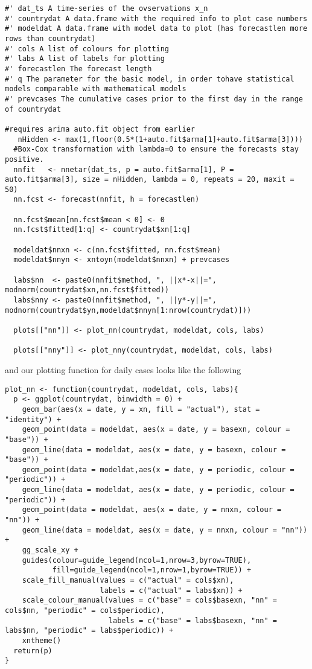 \begin{lstlisting}[frame=single, caption = {Algorithm for Neural Network Model}]
#' dat_ts A time-series of the ovservations x_n
#' countrydat A data.frame with the required info to plot case numbers
#' modeldat A data.frame with model data to plot (has forecastlen more rows than countrydat)
#' cols A list of colours for plotting
#' labs A list of labels for plotting
#' forecastlen The forecast length 
#' q The parameter for the basic model, in order tohave statistical models comparable with mathematical models
#' prevcases The cumulative cases prior to the first day in the range of countrydat

#requires arima auto.fit object from earlier
   nHidden <- max(1,floor(0.5*(1+auto.fit$arma[1]+auto.fit$arma[3])))
  #Box-Cox transformation with lambda=0 to ensure the forecasts stay positive.
  nnfit   <- nnetar(dat_ts, p = auto.fit$arma[1], P = auto.fit$arma[3], size = nHidden, lambda = 0, repeats = 20, maxit = 50) 
  nn.fcst <- forecast(nnfit, h = forecastlen)

  nn.fcst$mean[nn.fcst$mean < 0] <- 0
  nn.fcst$fitted[1:q] <- countrydat$xn[1:q]
 
  modeldat$nnxn <- c(nn.fcst$fitted, nn.fcst$mean)
  modeldat$nnyn <- xntoyn(modeldat$nnxn) + prevcases
  
  labs$nn  <- paste0(nnfit$method, ", ||x*-x||=", modnorm(countrydat$xn,nn.fcst$fitted))
  labs$nny <- paste0(nnfit$method, ", ||y*-y||=", modnorm(countrydat$yn,modeldat$nnyn[1:nrow(countrydat)]))
  
  plots[["nn"]] <- plot_nn(countrydat, modeldat, cols, labs)
  
  plots[["nny"]] <- plot_nny(countrydat, modeldat, cols, labs)
\end{lstlisting}

and our plotting function for daily cases looks like the following

\begin{lstlisting}[frame=single, caption = {Plot Neural Network Model}]
plot_nn <- function(countrydat, modeldat, cols, labs){
  p <- ggplot(countrydat, binwidth = 0) + 
    geom_bar(aes(x = date, y = xn, fill = "actual"), stat = "identity") + 
    geom_point(data = modeldat, aes(x = date, y = basexn, colour = "base")) + 
    geom_line(data = modeldat, aes(x = date, y = basexn, colour = "base")) +
    geom_point(data = modeldat,aes(x = date, y = periodic, colour = "periodic")) +
    geom_line(data = modeldat, aes(x = date, y = periodic, colour = "periodic")) +
    geom_point(data = modeldat, aes(x = date, y = nnxn, colour = "nn")) + 
    geom_line(data = modeldat, aes(x = date, y = nnxn, colour = "nn")) +
    gg_scale_xy + 
    guides(colour=guide_legend(ncol=1,nrow=3,byrow=TRUE),
           fill=guide_legend(ncol=1,nrow=1,byrow=TRUE)) +
    scale_fill_manual(values = c("actual" = cols$xn), 
                      labels = c("actual" = labs$xn)) +
    scale_colour_manual(values = c("base" = cols$basexn, "nn" = cols$nn, "periodic" = cols$periodic), 
                        labels = c("base" = labs$basexn, "nn" = labs$nn, "periodic" = labs$periodic)) +
    xntheme()
  return(p)
}
\end{lstlisting}

